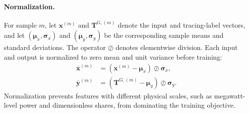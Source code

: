 \documentclass[letterpaper,journal]{IEEEtran}
\begin{document}
\paragraph{Normalization.}
For sample $m$, let $\mathbf{x}^{(m)}$ and $\mathbf{T}^{\mathrm{G},(m)}$ denote the input
and tracing-label vectors, and let $(\boldsymbol{\mu}_x,\boldsymbol{\sigma}_x)$ and
$(\boldsymbol{\mu}_y,\boldsymbol{\sigma}_y)$ be the corresponding sample means and standard
deviations. The operator $\oslash$ denotes elementwise division. Each input and output is
normalized to zero mean and unit variance before training:
\begin{subequations}
\label{eq:supp_normalization}
\begin{align}
\bar{\mathbf{x}}^{(m)}
&=(\mathbf{x}^{(m)}-\boldsymbol{\mu}_x)\oslash\boldsymbol{\sigma}_x,\\
\bar{\mathbf{y}}^{(m)}
&=(\mathbf{T}^{\mathrm{G},(m)}-\boldsymbol{\mu}_y)\oslash\boldsymbol{\sigma}_y.
\end{align}
\end{subequations}
Normalization prevents features with different physical scales, such as megawatt-level
power and dimensionless shares, from dominating the training objective.
\end{document}
